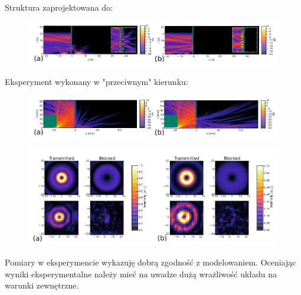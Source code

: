 \documentclass{beamer}
\begin{document}
\begin{frame}
	Struktura zaprojektowana do:
	\begin{figure}
		\includegraphics[width=\textwidth]{../images/dmg/express_high_contrast.png}\\
	\end{figure}
	Eksperyment wykonany w "przeciwnym" kierunku:
	\begin{figure}
		\includegraphics[width=\textwidth]{../images/dmg/express_zarmata.png}\\
	\end{figure}
		
\end{frame}

\begin{frame}
	\begin{figure}
		\includegraphics[width=\textwidth]{../images/dmg/express_exp.png}\\
	\end{figure}
	Pomiary w eksperymencie wykazuję dobrą zgodność z modelowaniem. Oceniając wyniki eksperymentalne należy mieć na uwadze dużą wrażliwość układu na warunki zewnętrzne.
		
\end{frame}
\end{document}
